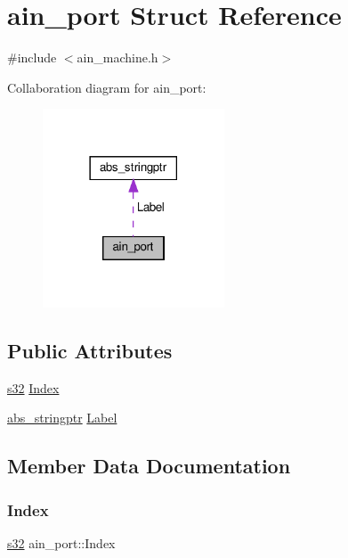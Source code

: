 \hypertarget{structain__port}{}\section{ain\+\_\+port Struct Reference}
\label{structain__port}


{\ttfamily \#include $<$ain\+\_\+machine.\+h$>$}



Collaboration diagram for ain\+\_\+port\+:\nopagebreak
\begin{figure}[H]
\begin{center}
\leavevmode
\includegraphics[width=153pt]{d0/d82/structain__port__coll__graph}
\end{center}
\end{figure}
\subsection*{Public Attributes}
\begin{DoxyCompactItemize}
\item 
\hyperlink{ab__common_8h_ae9b1af5c037e57a98884758875d3a7c4}{s32} \hyperlink{structain__port_aa56db8ea0d8c5fea6d6d99c1ed28feee}{Index}
\item 
\hyperlink{structabs__stringptr}{abs\+\_\+stringptr} \hyperlink{structain__port_ac2269d031ae51cd227f87391fba81b1a}{Label}
\end{DoxyCompactItemize}


\subsection{Member Data Documentation}
\mbox{\label{structain__port_aa56db8ea0d8c5fea6d6d99c1ed28feee}} 
\subsubsection{\texorpdfstring{Index}{Index}}
{\footnotesize\ttfamily \hyperlink{ab__common_8h_ae9b1af5c037e57a98884758875d3a7c4}{s32} ain\+\_\+port\+::\+Index}

